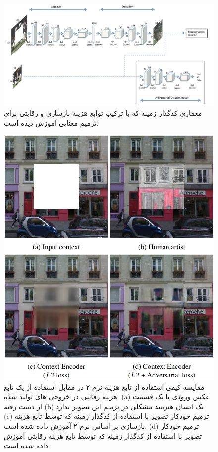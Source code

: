\begin{figure}
	\centering
	\includegraphics[width=1\linewidth]{pathakGanArch}
	\caption{معماری کدگذار زمینه که با ترکیب توابع هزینه بازسازی و رقابتی برای ترمیم معنایی آموزش دیده است.}
	\label{fig:pathakganarch}
\end{figure}



\begin{figure}
	\centering
	\includegraphics[width=0.7\linewidth]{figs/contextencodersLossComparison}
	\caption{مقایسه کیفی  استفاده از تابع هزینه نرم  ۲ در مقابل استفاده از یک تابع هزینه رقابتی در خروجی های تولید شده. 
		(a) عکس ورودی با یک قسمت از دست رفته 
		(b) یک انسان هنرمند مشکلی در ترمیم این تصویر ندارد 
		(c)
ترمیم خودکار تصویر با استفاده از کدگذار زمینه که توسط تابع هزینه بازسازی بر اساس نرم ۲ آموزش داده شده است.
	(d)
ترمیم خودکار تصویر با استفاده از کدگذار زمینه که توسط تابع هزینه رقابتی آموزش داده شده است.
}
	\label{fig:contextencoderslosscomparison}
\end{figure}



